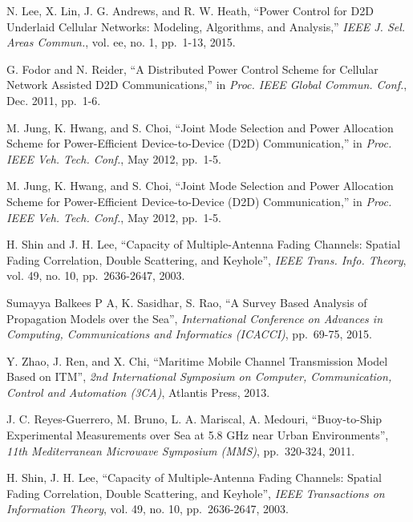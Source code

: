 \documentclass{ieeeaccess}
\begin{document}
\begin{thebibliography}{10}
  N. Lee, X. Lin, J. G. Andrews, and R. W. Heath, ``Power Control for D2D Underlaid Cellular Networks: Modeling, Algorithms, and Analysis,''
  \emph{IEEE J. Sel. Areas Commun.}, vol. ee, no. 1, pp.~1-13, 2015.

  G. Fodor and N. Reider, ``A Distributed Power Control Scheme for Cellular Network Assisted D2D Communications,'' in
  \emph{Proc. IEEE Global Commun. Conf.}, Dec. 2011, pp.~1-6.

  M. Jung, K. Hwang, and S. Choi, ``Joint Mode Selection and Power Allocation Scheme for Power-Efficient Device-to-Device (D2D) Communication,'' in
  \emph{Proc. IEEE Veh. Tech. Conf.}, May 2012, pp.~1-5.
  
  M. Jung, K. Hwang, and S. Choi, ``Joint Mode Selection and Power Allocation Scheme for Power-Efficient Device-to-Device (D2D) Communication,'' in
  \emph{Proc. IEEE Veh. Tech. Conf.}, May 2012, pp.~1-5.

  H. Shin and J. H. Lee, ``Capacity of Multiple-Antenna Fading Channels: Spatial Fading Correlation, Double Scattering, and Keyhole'',
  \emph{IEEE Trans. Info. Theory}, vol. 49, no. 10, pp.~2636-2647, 2003.

  Sumayya Balkees P A, K. Sasidhar, S. Rao, ``A Survey Based Analysis of Propagation Models over the Sea'',
  \emph{International Conference on Advances in Computing, Communications and Informatics (ICACCI)}, pp.~69-75, 2015.
  
  Y. Zhao, J. Ren, and X. Chi, ``Maritime Mobile Channel Transmission Model Based on ITM'',
  \emph{2nd International Symposium on Computer, Communication, Control and Automation (3CA)}, Atlantis Press, 2013.
  
  J. C. Reyes-Guerrero, M. Bruno, L. A. Mariscal, A. Medouri, ``Buoy-to-Ship Experimental Measurements over Sea at 5.8 GHz near Urban Environments'',
  \emph{11th Mediterranean Microwave Symposium (MMS)}, pp.~320-324, 2011.


  H. Shin, J. H. Lee, ``Capacity of Multiple-Antenna Fading Channels: Spatial Fading Correlation, Double Scattering, and Keyhole'',
  \emph{IEEE Transactions on Information Theory}, vol. 49, no. 10, pp.~2636-2647, 2003.


\end{thebibliography}
\end{document}

